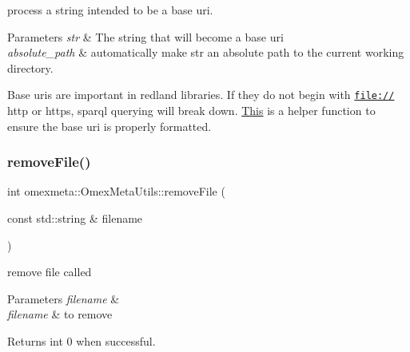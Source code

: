 process a string intended to be a base uri. 


\begin{DoxyParams}{Parameters}
{\em str} & The string that will become a base uri \\
\hline
{\em absolute\+\_\+path} & automatically make str an absolute path to the current working directory.\\
\hline
\end{DoxyParams}
Base uri\textquotesingle{}s are important in redland libraries. If they do not begin with {\ttfamily \href{file://}{\tt file\+://}} {\ttfamily http} or {\ttfamily https}, sparql querying will break down. \hyperlink{classThis}{This} is a helper function to ensure the base uri is properly formatted. \mbox{\label{classomexmeta_1_1OmexMetaUtils_a9c445a8e0cc6589b25d6fa630686c171}} 
\subsubsection{\texorpdfstring{remove\+File()}{removeFile()}}
{\footnotesize\ttfamily int omexmeta\+::\+Omex\+Meta\+Utils\+::remove\+File (\begin{DoxyParamCaption}\item[{const std\+::string \&}]{filename }\end{DoxyParamCaption})\hspace{0.3cm}{\ttfamily [static]}}



remove file called 


\begin{DoxyParams}{Parameters}
{\em filename} & \\
\hline
{\em filename} & to remove \\
\hline
\end{DoxyParams}
\begin{DoxyReturn}{Returns}
int 0 when successful. 
\end{DoxyReturn}
\mbox{\label{classomexmeta_1_1OmexMetaUtils_a8e629136cb2685ed839ea3a0e88094e6}} 
